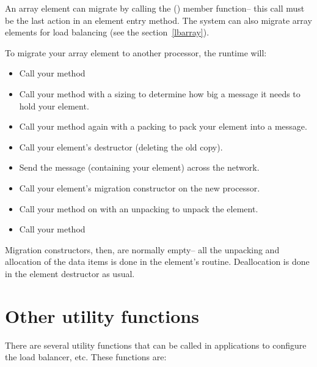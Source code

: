 An array element can migrate by calling the () member function-- this call must be the last action
in an element entry method.  The system can also migrate array elements
for load balancing (see the section~\ref{lbarray}).

To migrate your array element to another processor, the \charmpp{}
runtime will:

\begin{itemize}
\item Call your  method
\item Call your  method with a sizing  to determine how 
big a message it needs to hold your element.
\item Call your  method again with a packing  to pack 
your element into a message.
\item Call your element's destructor (deleting the old copy).
\item Send the message (containing your element) across the network.
\item Call your element's migration constructor on the new processor.
\item Call your  method on with an unpacking  to unpack 
the element.
\item Call your  method
\end{itemize}

Migration constructors, then, are normally empty-- all the unpacking
and allocation of the data items is done in the element's  routine.
Deallocation is done in the element destructor as usual.


\section{Other utility functions}

There are several utility functions that can be called in applications to
configure the load balancer, etc. These functions are:

